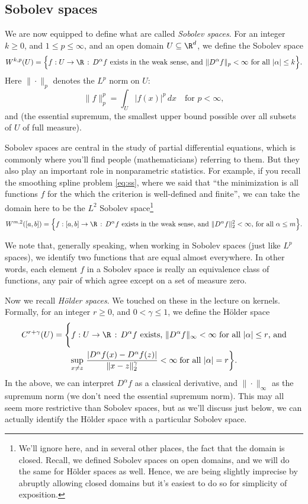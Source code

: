 \documentclass{article}
\DeclareMathOperator*{\esssup}{ess\,sup}
\begin{document}
\subsection{Sobolev spaces}

We are now equipped to define what are called \emph{Sobolev spaces}. For an
integer $k \geq  0$, and $1 \leq p \leq \infty$, and an open domain $U \subseteq 
\R^d$, we define the Sobolev space        
\[
W^{k,p}(U) = \Big\{ f : U \to \R \,:\, \text{$D^\alpha f$ exists in the weak
  sense, and $\|D^\alpha f\|_p < \infty$ for all $|\alpha| \leq k$} \Big\}. 
\]
Here $\|\cdot\|_p$ denotes the $L^p$ norm on $U$: 
\[
\|f\|_p^p = \int_U |f(x)|^p \, dx \quad \text{for $p < \infty$}, 
\]
and \smash{$\|f\|_\infty = \esssup_{x \in U} \, |f(x)|$} (the essential
supremum, the smallest upper bound possible over all subsets of $U$ of full
measure).

Sobolev spaces are central in the study of partial differential equations, which
is commonly where you'll find people (mathematicians) referring to them. But
they also play an important role in nonparametric statistics. For example, if
you recall the smoothing spline problem \eqref{eq:ss}, where we said that ``the
minimization is all functions $f$ for the which the criterion is well-defined
and finite'', we can take the domain here to be the $L^2$ Sobolev
space\footnote{We'll ignore here, and in several other places, the fact that the
  domain is closed. Recall, we defined Sobolev spaces on open domains, and we
  will do the same for H{\"o}lder spaces as well. Hence, we are being slightly
  imprecise by abruptly allowing closed domains but it's easiest to do so for
  simplicity of exposition.}     
\[
W^{m,2}([a,b]) = \Big\{ f : [a,b] \to \R \,:\, \text{$D^\alpha f$ exists in the
  weak sense, and $\|D^\alpha f\|_2^2 < \infty$, for all $\alpha \leq m$}
\Big\}.     
\]

We note that, generally speaking, when working in Sobolev spaces (just like
$L^p$ spaces), we identify two functions that are equal almost everywhere. In 
other words, each element $f$ in a Sobolev space is really an equivalence class
of functions, any pair of which agree except on a set of measure zero.

Now we recall \emph{H{\"o}lder spaces}. We touched on these in the lecture on 
kernels. Formally, for an integer $r \geq 0$, and $0 < \gamma \leq 1$, we define
the H{\"o}lder space
\begin{multline*}
C^{r+\gamma}(U) = \Bigg\{ f : U \to \R \,:\, \text{$D^\alpha f$ exists,
  $\|D^\alpha f\|_\infty < \infty$ for all $|\alpha| \leq r$, and} \\   
  \sup_{x \not= z} \, \frac{|D^\alpha f(x) - D^\alpha f(z)|}{\|x-z\|_2^\gamma} < 
  \infty \; \text{for all $|\alpha| = r$} \bigg\}.   
\end{multline*}
In the above, we can interpret $D^\alpha f$ as a classical derivative, and
$\|\cdot\|_\infty$ as the supremum norm (we don't need the essential supremum
norm). This may all seem more restrictive than Sobolev spaces, but as we'll
discuss just below, we can actually identify the H{\"o}lder space with a
particular Sobolev space.       
\end{document}
